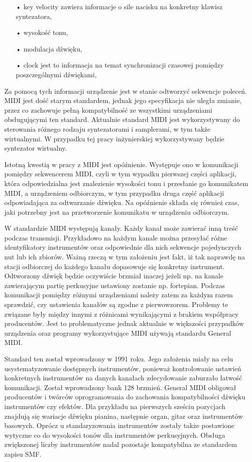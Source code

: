 \begin{itemize}
\item[•]{key velocity zawiera informacje o sile nacisku na konkretny klawisz syntezatora,}
\item[•]{wysokość tonu,}
\item[•]{modulacja dźwięku,}
\item[•]{clock jest to informacja na temat synchronizacji czasowej pomiędzy poszczególnymi dźwiękami,}
\end{itemize}

Za pomocą tych informacji urządzenie jest w stanie odtworzyć sekwencje poleceń.  MIDI jest dość starym standardem, jednak jego specyfikacja nie uległa zmianie, przez co zachowuje pełną kompatybilność ze wszystkimi urządzeniami obsługującymi ten standard. Aktualnie standard MIDI jest wykorzystywany do sterowania różnego rodzaju syntezatorami i samplerami, w tym także wirtualnymi. W przypadku tej pracy inżynierskiej wykorzystywany będzie syntezator wirtualny. 


Istotną kwestią w pracy z  MIDI jest opóźnienie. Występuje ono w komunikacji pomiędzy sekwencerem MIDI, czyli w tym wypadku pierwszej części aplikacji, która odpowiedzialna jest znalezienie wysokości tonu i przesłanie go komunikatem MIDI, a urządzeniem odbiorczym, w tym przypadku druga część aplikacji odpowiadająca za odtwarzanie dźwięku. Na opóźnienie składa się również czas, jaki potrzebny jest na przetworzenie komunikatu w urządzeniu odbiorczym.


W standardzie MIDI występują kanały. Każdy kanał może zawierać inną treść podczas transmisji. Przykładowo na każdym kanale można przesyłać różne identyfikatory instrumentów oraz odpowiednie dla nich sekwencje pojedynczych nut lub ich zbiorów. Ważną rzeczą w tym założeniu jest fakt, iż tak naprawdę na stacji odbiorczej do każdego kanału dopasowuje się konkretny instrument. Odtworzony dźwięk będzie oczywiście brzmiał inaczej jeżeli np. na kanale zawierającym partię perkusyjne ustawiony zostanie np. fortepian. Podczas komunikacji pomiędzy różnymi urządzeniami należy zatem za każdym razem sprawdzić, czy ustawienia kanałów są zgodne z pierwowzorem. Problemy te związane były między innymi z różnicami wynikającymi z brakiem współpracy producentów. Jest to problematyczne jednak aktualnie w większości przypadków urządzenia  oraz programy wykorzystujące MIDI używają standardu General MIDI.


Standard ten został wprowadzony w 1991 roku. Jego założenia miały na celu usystematyzowanie dostępnych instrumentów, ponieważ kontrolowanie ustawień konkretnych instrumentów na danych kanałach zdecydowanie zaburzało łatwość komunikacji. Został wprowadzony bank 128 brzmień. General MIDI obligował producentów i twórców oprogramowania do zachowania kompatybilności dźwięku instrumentów czy efektów. Dla przykładu na pierwszych sześciu pozycjach znajdują się wariacje dźwięku pianina, następnie organ, gitar oraz instrumentów basowych. Oprócz u standaryzowania instrumentów zostały także postawione wytyczne co do wysokości tonów dla instrumentów perkusyjnych. Obsługa zwiększonej liczby instrumentów nadal pozostaje kompatybilna ze standardem zapisu SMF.


